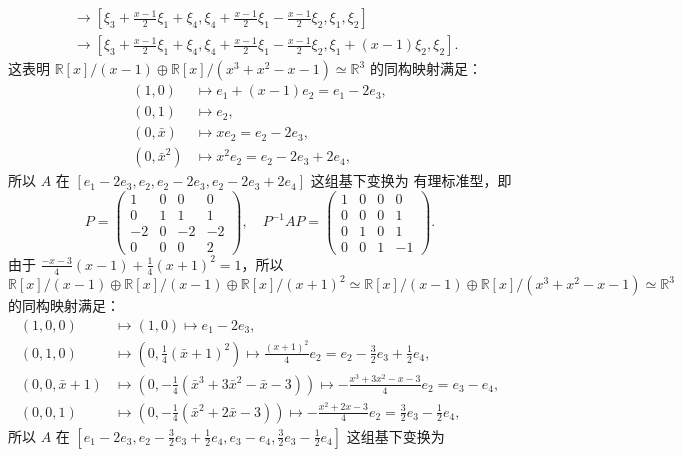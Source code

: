 \documentclass[fontset=none,zihao=-4]{Notes}
\begin{document}
\begin{solution}
\begin{align*}
    &\to\left[\xi_3+\frac{x-1}{2}\xi_1+\xi_4,\xi_4+\frac{x-1}{2}\xi_1-\frac{x-1}{2}\xi_2,\xi_1,\xi_2\right]\\
    &\to\left[\xi_3+\frac{x-1}{2}\xi_1+\xi_4,\xi_4+\frac{x-1}{2}\xi_1-\frac{x-1}{2}\xi_2,\xi_1+(x-1)\xi_2,\xi_2\right].
  \end{align*}
  这表明 $\mathbb{R}[x]/(x-1)\oplus\mathbb{R}[x]/(x^3+x^2-x-1)\simeq\mathbb{R}^3$
  的同构映射满足：
  \begin{align*}
    (1,0)&\mapsto e_1+(x-1)e_2=e_1-2e_3,\\
    (0,1)&\mapsto e_2,\\
    (0,\bar x)&\mapsto xe_2=e_2-2e_3,\\
    (0,\bar x^2)&\mapsto x^2e_2=e_2-2e_3+2e_4,
  \end{align*}
  所以 $A$ 在 $[e_1-2e_3,e_2,e_2-2e_3,e_2-2e_3+2e_4]$ 这组基下变换为
  有理标准型，即
  \[
    P=
    \begin{pmatrix}
      1 & 0 & 0 & 0 \\
      0 & 1 & 1 & 1 \\
      -2 & 0 & -2 & -2 \\
      0 & 0 & 0 & 2
    \end{pmatrix}  ,\quad
    P^{-1}AP=
    \begin{pmatrix}
      1 & 0 & 0 & 0 \\
      0 & 0 & 0 & 1 \\
      0 & 1 & 0 & 1 \\
      0 & 0 & 1 & -1
    \end{pmatrix}.
  \]
  由于 $\frac{-x-3}{4}(x-1)+\frac{1}{4}(x+1)^2=1$，所以
  \[
    \mathbb{R}[x]/(x-1)\oplus\mathbb{R}[x]/(x-1)\oplus\mathbb{R}[x]/(x+1)^2\simeq
    \mathbb{R}[x]/(x-1)\oplus\mathbb{R}[x]/(x^3+x^2-x-1)\simeq \mathbb{R}^3  
  \]
  的同构映射满足：
  \begin{align*}
    (1,0,0)&\mapsto (1,0)\mapsto e_1-2e_3,\\
    (0,1,0)&\mapsto \left(0,\frac{1}{4}(\bar x+1)^2\right)
    \mapsto \frac{(x+1)^2}{4}e_2=e_2-\frac{3}{2}e_3+\frac{1}{2}e_4,\\
    (0,0,\bar x+1)&\mapsto \left(0,-\frac{1}{4}(\bar x^3+3\bar x^2-\bar x-3)\right)
    \mapsto -\frac{x^3+3x^2-x-3}{4}e_2=e_3-e_4,\\
    (0,0,1)&\mapsto \left(0,-\frac{1}{4}(\bar x^2+2\bar x-3)\right)\mapsto
    -\frac{x^2+2x-3}{4}e_2=\frac{3}{2}e_3-\frac{1}{2}e_4,
  \end{align*}
  所以 $A$ 在 
  $[e_1-2e_3,e_2-\frac{3}{2}e_3+\frac{1}{2}e_4,e_3-e_4,\frac{3}{2}e_3-\frac{1}{2}e_4]$ 这组基下变换为

\end{solution}
\end{document}
